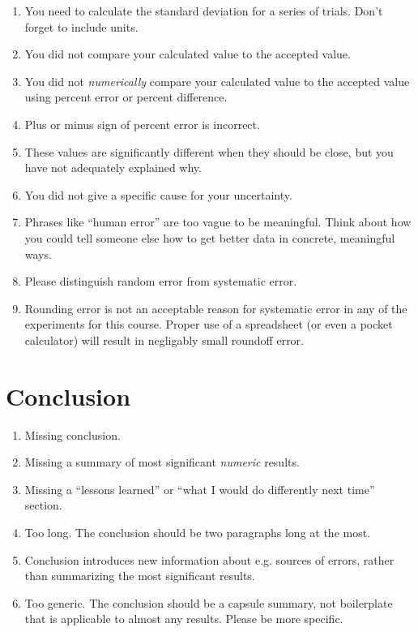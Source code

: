 \documentclass[10pt,letterpaper]{article}
\begin{document}
\begin{multicols}{2}
\begin{enumerate}[start=130]
  \item You need to calculate the standard deviation
    for a series of trials. Don't forget to include units.
  \item You did not compare your calculated value to the accepted value.
  \item You did not \emph{numerically} compare your calculated value
    to the accepted value using percent error or percent difference.
  \item Plus or minus sign of percent error is incorrect.
  \item These values are significantly different when they should be close,
    but you have not adequately explained why.
  \item You did not give a specific cause for your uncertainty.
  \item Phrases like ``human error'' are too vague to be meaningful.
    Think about how you could tell someone else how to get better data
    in concrete, meaningful ways.
  \item Please distinguish random error from systematic error.
  \item Rounding error is not an acceptable reason for systematic error
    in any of the experiments for this course.
    Proper use of a spreadsheet (or even a pocket calculator)
    will result in negligably small roundoff error.
\end{enumerate}

\section*{Conclusion}

\begin{enumerate}[start=140]
  \item Missing conclusion.
  \item Missing a summary of most significant \emph{numeric} results.
  \item Missing a ``lessons learned'' or
    ``what I would do differently next time'' section.
  \item Too long.
    The conclusion should be two paragraphs long at the most.
  \item Conclusion introduces new information about e.g. sources of errors,
    rather than summarizing the most significant results.
  \item Too generic.
    The conclusion should be a capsule summary,
    not boilerplate that is applicable to almost any results.
    Please be more specific.
\end{enumerate}


\end{multicols}
\end{document}
